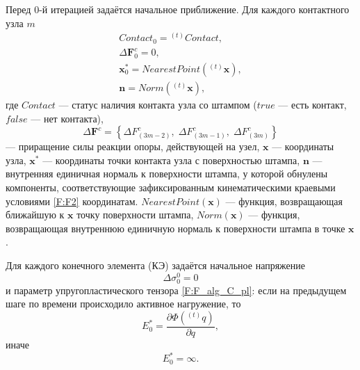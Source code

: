 \documentclass[]{article}
\begin{document}
Перед $0$-й итерацией задаётся начальное приближение. Для каждого контактного узла $m$
\begin{equation}
\begin{gathered}
Contact_0={}^{(t)}Contact,\\
\Delta\mathbf{F}_0^c=0,\\
\mathbf{x}_0^*=NearestPoint \left({}^{(t)}\mathbf{x}\right),\\
\mathbf{n}=Norm\left({}^{(t)}\mathbf{x}\right),
\label{F:F_alg_contact_nach}
\end{gathered}
\end{equation}
где $Contact$ --- статус наличия контакта узла со штампом ($true$ --- есть контакт, $false$ --- нет контакта),
\begin{equation}
\Delta\mathbf{F}^c=\left\lbrace \Delta F_{\left( 3m-2\right) }^{c},\;\Delta F_{\left( 3m-1\right) }^{c},\;\Delta F_{\left( 3m\right) }^{c}\right\rbrace
\label{F:F_alg_deltaF}
\end{equation}
--- приращение силы реакции опоры, действующей на узел, $\mathbf{x}$ --- координаты узла, $\mathbf{x}^*$ --- координаты точки контакта узла с поверхностью штампа, $\mathbf{n}$ --- внутренняя единичная нормаль к поверхности штампа, у которой обнулены компоненты, соответствующие зафиксированным кинематическими краевыми условиями \eqref{F:F2} координатам. $NearestPoint \left(\mathbf{x}\right)$ --- функция, возвращающая ближайшую к $\mathbf{x}$ точку поверхности штампа, $Norm \left(\mathbf{x}\right)$ --- функция, возвращающая внутреннюю единичную нормаль к поверхности штампа в точке $\mathbf{x}$.

Для каждого конечного элемента (КЭ) задаётся начальное напряжение
\begin{equation}
\Delta\sigma_0^0=0
\label{F:F_alg_ep_nach1}
\end{equation}
и параметр упругопластического тензора \eqref{F:F_alg_C_pl}: если на предыдущем шаге по времени происходило активное нагружение, то
\begin{equation}
E_0^*=\frac{\partial\Phi\left({}^{(t)}q\right)}{\partial q},
\label{F:F_alg_ep_nach2}
\end{equation}
иначе
\begin{equation}
E_0^*=\infty.
\label{F:F_alg_ep_nach3}
\end{equation}
\end{document}
